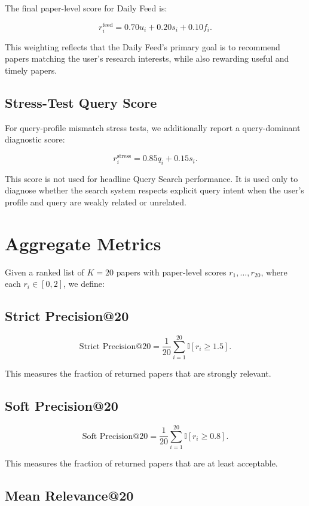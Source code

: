 \documentclass[11pt]{article}
\begin{document}
The final paper-level score for Daily Feed is:

\[
r_i^{\text{feed}} =
0.70 u_i + 0.20 s_i + 0.10 f_i.
\]

This weighting reflects that the Daily Feed's primary goal is to recommend papers matching the user's research interests, while also rewarding useful and timely papers.

\subsection{Stress-Test Query Score}

For query-profile mismatch stress tests, we additionally report a query-dominant diagnostic score:

\[
r_i^{\text{stress}} =
0.85 q_i + 0.15 s_i.
\]

This score is not used for headline Query Search performance. It is used only to diagnose whether the search system respects explicit query intent when the user's profile and query are weakly related or unrelated.

\section{Aggregate Metrics}

Given a ranked list of $K=20$ papers with paper-level scores $r_1,\ldots,r_{20}$, where each $r_i \in [0,2]$, we define:

\subsection{Strict Precision@20}

\[
\text{Strict Precision@20}
=
\frac{1}{20}\sum_{i=1}^{20}
\mathbb{I}[r_i \geq 1.5].
\]

This measures the fraction of returned papers that are strongly relevant.

\subsection{Soft Precision@20}

\[
\text{Soft Precision@20}
=
\frac{1}{20}\sum_{i=1}^{20}
\mathbb{I}[r_i \geq 0.8].
\]

This measures the fraction of returned papers that are at least acceptable.

\subsection{Mean Relevance@20}
\end{document}
